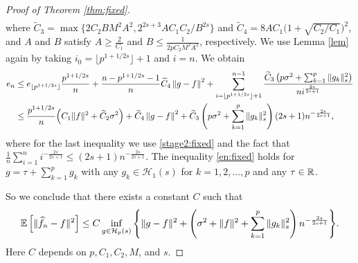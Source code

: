 \begin{proof}[Proof of Theorem \ref{thm:fixed}]
\begin{align*}
\end{align*}
where $\tilde C_3 =  \max\{2C_2BM^2A^2, 2^{2s+3}AC_1C_2/B^{2s}\}$ and $\tilde C_4 = 8AC_1\big(1+\sqrt{C_2/C_1}\big)^2$, and $A$ and $B$ satisfy  $A \geq \frac{2}{C_1}$ and $B \leq \frac{1}{2pC_2M^2A^2}$, respectively. We use Lemma \ref{lem} again by taking $i_0 = \lfloor p^{1+1/2s}\rfloor+1$ and $i=n$. We obtain
\begin{align}
    e_n &\leq e_{\lfloor p^{1+1/2s}\rfloor}\frac{p^{1+1/2s}}{n} + \frac{n - p^{1+1/2s}-1}{n}\widetilde C_4 \left\|g-f\right\|^2 + \sum_{i=\lfloor p^{1+1/2s}\rfloor+1}^{n-1}\frac{\widetilde C_3\left(p\sigma^2+\sum_{k=1}^p\|g_k\|_s^2\right)}{ni^{\frac{2s}{2s+1}}} \notag\\
    &\leq  \frac{p^{1+1/2s}}{n}\Big(C_1\|f\|^2 + \widetilde C_2 \sigma^2\Big) +\widetilde C_4 \left\|g-f\right\|^2 + \widetilde C_3\left(p\sigma^2+\sum_{k=1}^p\|g_k\|_s^2\right)(2s+1)n^{-\frac{2s}{2s+1}}, \label{en:fixed}
\end{align}
where for the last inequality we use \eqref{stage2:fixed} and the fact that $\frac{1}{n}\sum_{i=1}^n i^{-\frac{2s}{2s+1}} \leq (2s+1)n^{-\frac{2s}{2s+1}}$.
The inequality \eqref{en:fixed} holds for $g = \tau + \sum_{k=1}^p g_k$ with any $g_k \in \mathcal{H}_1(s)$ for  $k=1,2,\dots,p$ and any $\tau \in \mathbb{R}$.

So we conclude that there exists a constant $C$ such that
\begin{equation*}
    \mathbb{E} \left[\| \widehat{f}_n - f\|^2 \right] \leq C\inf_{g\in \mathcal{H}_p(s)} \Bigg\{ \|g-f\|^2 + \left(\sigma^2+\|f\|^2+\sum_{k=1}^p\|g_k\|^2_s \right) n^{-\frac{2s}{2s+1}}\Bigg\}.
\end{equation*}
Here $C$ depends on $p,C_1,C_2,M$, and $s$.
\end{proof}

